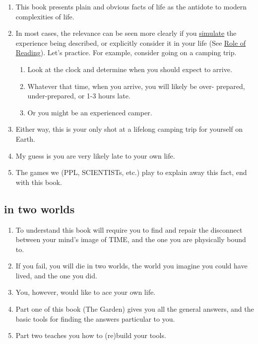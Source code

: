\documentclass[
]{book}
\providecommand{\tightlist}{%
  \setlength{\itemsep}{0pt}\setlength{\parskip}{0pt}}
\begin{document}
\begin{enumerate}
\def\labelenumi{\arabic{enumi}.}
\setcounter{enumi}{12}
\tightlist
\item
  This book presents plain and obvious facts of life as the antidote to modern complexities of life.
\item
  In most cases, the relevance can be seen more clearly if you \protect\hyperlink{words}{simulate} the experience being described, or explicitly consider it in your life (See \protect\hyperlink{read}{Role of Reading}). Let's practice. For example, consider going on a camping trip.

  \begin{enumerate}
  \def\labelenumii{\arabic{enumii}.}
  \tightlist
  \item
    Look at the clock and determine when you should expect to arrive.
  \item
    Whatever that time, when you arrive, you will likely be over- prepared, under-prepared, or 1-3 hours late.
  \item
    Or you might be an experienced camper.
  \end{enumerate}
\item
  Either way, this is your only shot at a lifelong camping trip for yourself on Earth.
\item
  My guess is you are very likely late to your own life.
\item
  The games we (PPL, SCIENTISTs, etc.) play to explain away this fact, end with this book.
\end{enumerate}

\hypertarget{in-two-worlds}{%
\subsection{in two worlds}\label{in-two-worlds}}

\begin{enumerate}
\def\labelenumi{\arabic{enumi}.}
\setcounter{enumi}{17}
\item
  To understand this book will require you to find and repair the disconnect between your mind's image of TIME, and the one you are physically bound to.
\item
  If you fail, you will die in two worlds, the world you imagine you could have
  lived, and the one you did.
\item
  You, however, would like to ace your own life.
\item
  Part one of this book (The Garden) gives you all the general answers, and the basic tools for finding the answers particular to you.
\item
  Part two teaches you how to (re)build your tools.
\end{enumerate}
\end{document}
